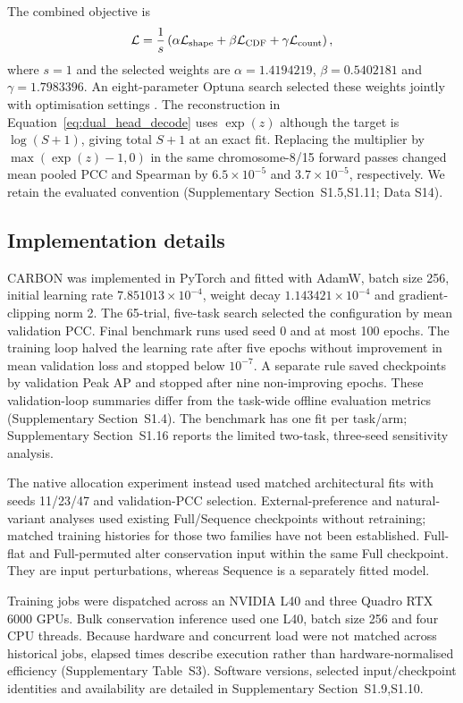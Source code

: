 \documentclass[webpdf,contemporary,large]{oup-authoring-template}
\newcommand{\suptab}[1]{Supplementary Table~#1}
\newcommand{\supsect}[1]{Supplementary Section~#1}
\begin{document}
The combined objective is
\begin{equation}
\mathcal L=\frac1s
\left(\alpha\mathcal L_{\rm shape}+
\beta\mathcal L_{\rm CDF}+\gamma\mathcal L_{\rm count}\right),
\label{eq:total_loss}
\end{equation}
where $s=1$ and the selected weights are $\alpha=1.4194219$, $\beta=0.5402181$ and $\gamma=1.7983396$. An eight-parameter Optuna search selected these weights jointly with optimisation settings \citep{akiba2019optuna}. The reconstruction in Equation~\ref{eq:dual_head_decode} uses $\exp(z)$ although the target is $\log(S+1)$, giving total $S+1$ at an exact fit. Replacing the multiplier by $\max(\exp(z)-1,0)$ in the same chromosome-8/15 forward passes changed mean pooled PCC and Spearman by $6.5\times10^{-5}$ and $3.7\times10^{-5}$, respectively. We retain the evaluated convention (\supsect{S1.5,S1.11}; Data S14).

\subsection{Implementation details}\label{sec:impl}

CARBON was implemented in PyTorch and fitted with AdamW, batch size 256, initial learning rate $7.851013\times10^{-4}$, weight decay $1.143421\times10^{-4}$ and gradient-clipping norm 2. The 65-trial, five-task search selected the configuration by mean validation PCC. Final benchmark runs used seed 0 and at most 100 epochs. The training loop halved the learning rate after five epochs without improvement in mean validation loss and stopped below $10^{-7}$. A separate rule saved checkpoints by validation Peak AP and stopped after nine non-improving epochs. These validation-loop summaries differ from the task-wide offline evaluation metrics (\supsect{S1.4}). The benchmark has one fit per task/arm; \supsect{S1.16} reports the limited two-task, three-seed sensitivity analysis.

The native allocation experiment instead used matched architectural fits with seeds 11/23/47 and validation-PCC selection. External-preference and natural-variant analyses used existing Full/Sequence checkpoints without retraining; matched training histories for those two families have not been established. Full-flat and Full-permuted alter conservation input within the same Full checkpoint. They are input perturbations, whereas Sequence is a separately fitted model.

Training jobs were dispatched across an NVIDIA L40 and three Quadro RTX 6000 GPUs. Bulk conservation inference used one L40, batch size 256 and four CPU threads. Because hardware and concurrent load were not matched across historical jobs, elapsed times describe execution rather than hardware-normalised efficiency (\suptab{S3}). Software versions, selected input/checkpoint identities and availability are detailed in \supsect{S1.9,S1.10}.
\end{document}
